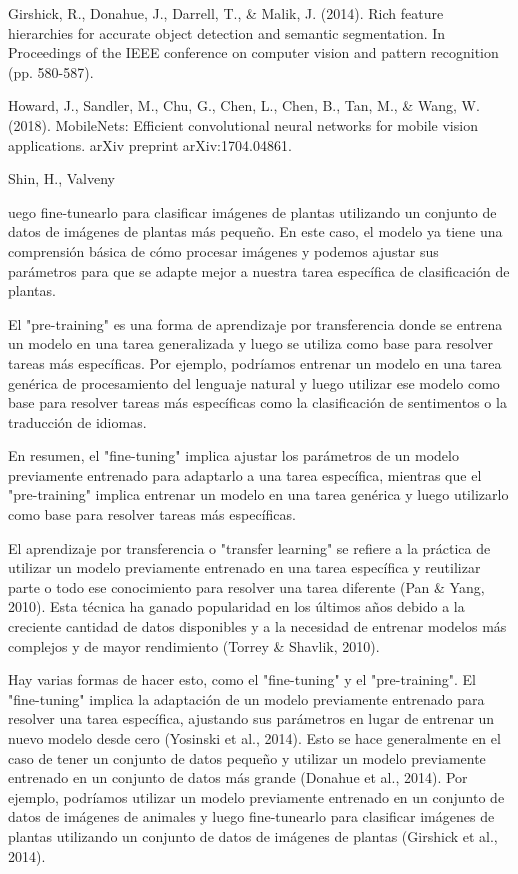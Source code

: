 Girshick, R., Donahue, J., Darrell, T., \& Malik, J. (2014). Rich feature hierarchies for accurate object detection and
semantic segmentation. In Proceedings of the IEEE conference on computer vision and pattern recognition (pp. 580-587).

Howard, J., Sandler, M., Chu, G., Chen, L., Chen, B., Tan, M., \& Wang, W. (2018). MobileNets: Efficient convolutional
neural networks for mobile vision applications. arXiv preprint arXiv:1704.04861.

Shin, H., Valveny

uego fine-tunearlo para clasificar imágenes de plantas utilizando un conjunto de datos de imágenes de plantas más
pequeño. En este caso, el modelo ya tiene una comprensión básica de cómo procesar imágenes y podemos ajustar sus
parámetros para que se adapte mejor a nuestra tarea específica de clasificación de plantas.

El "pre-training" es una forma de aprendizaje por transferencia donde se entrena un modelo en una tarea generalizada y
luego se utiliza como base para resolver tareas más específicas. Por ejemplo, podríamos entrenar un modelo en una tarea
genérica de procesamiento del lenguaje natural y luego utilizar ese modelo como base para resolver tareas más
específicas como la clasificación de sentimentos o la traducción de idiomas.

En resumen, el "fine-tuning" implica ajustar los parámetros de un modelo previamente entrenado para adaptarlo a una
tarea específica, mientras que el "pre-training" implica entrenar un modelo en una tarea genérica y luego utilizarlo
como base para resolver tareas más específicas.


El aprendizaje por transferencia o "transfer learning" se refiere a la práctica de utilizar un modelo previamente
entrenado en una tarea específica y reutilizar parte o todo ese conocimiento para resolver una tarea diferente (Pan \&
Yang, 2010). Esta técnica ha ganado popularidad en los últimos años debido a la creciente cantidad de datos disponibles
y a la necesidad de entrenar modelos más complejos y de mayor rendimiento (Torrey \& Shavlik, 2010).

Hay varias formas de hacer esto, como el "fine-tuning" y el "pre-training". El "fine-tuning" implica la adaptación de
un modelo previamente entrenado para resolver una tarea específica, ajustando sus parámetros en lugar de entrenar un
nuevo modelo desde cero (Yosinski et al., 2014). Esto se hace generalmente en el caso de tener un conjunto de datos
pequeño y utilizar un modelo previamente entrenado en un conjunto de datos más grande (Donahue et al., 2014). Por
ejemplo, podríamos utilizar un modelo previamente entrenado en un conjunto de datos de imágenes de animales y luego
fine-tunearlo para clasificar imágenes de plantas utilizando un conjunto de datos de imágenes de plantas (Girshick et
al., 2014).


